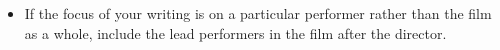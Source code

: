 \begin{itemize}\item If the focus of your writing is on a particular performer rather than the film as a whole, include the lead performers in the film after the director. \end{itemize}



